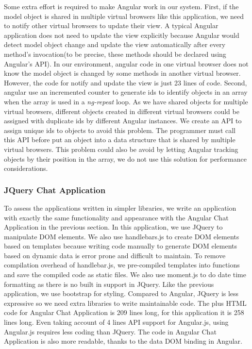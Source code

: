 Some extra effort is required to make Angular work in our system.
First, if the model object is shared in multiple virtual browsers like this application,
we need to notify other virtual browsers to update their view.
A typical Angular application does not need to update the view explicitly because
Angular would detect model object change and update the view automatically 
after every method's invocation(to be precise, these methods should be declared using Angular's API).
In our environment, angular code in one virtual browser does not know the model object
is changed by some methods in another virtual browser.
However, the code for notify and update the view is just 23 lines of code.
Second, angular use an incremented counter to generate ids to identify objects in an array when the 
array is used in a \emph{ng-repeat} loop.
As we have shared objects for multiple virtual browsers,
different objects created in different virtual browsers could be assigned with duplicate 
ids by different Angular instances.
We create an API to assign unique ids to objects to avoid this problem.
The programmer must call this API before put an object into a data structure that is shared
by multiple virtual browsers.
This problem could also be avoid by letting Angular tracking objects by their position in the array,
we do not use this solution for performance considerations.


\angularchatlatency{}

\subsubsection{JQuery Chat Application}
\label{sec:jquery}
To assess the applications written in simpler \js{} libraries,
we write an application with exactly the same functionality and 
appearance with the Angular Chat Application in the previous section.
In this application, we use JQuery to manipulate DOM elements.
We also use handlebars.js to create DOM elements based on templates
because writing code manually to generate DOM elements based on dynamic data 
is error prone and difficult to maintain.
To remove compilation overhead of handlebar.js, 
we pre-compiled templates into \js{} functions and save the compiled code as static files.
We also use moment.js to do date time formatting as there is no built in support 
in JQuery.
Like the previous application, we use bootstrap for styling.
Compared to Angular, JQuery is less expressive so we need
extra libraries to write maintainable code.
The \js{} plus HTML code for Angular Chat Application is 209 lines long,
for this application it is 258 lines long.
Even taking account of 4 lines API support for Angular.js, 
using Angular.js requires less coding than JQuery.
The code in Angular Chat Application is also more readable,
thanks to the data DOM binding in Angular.


